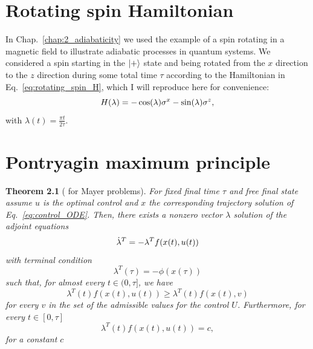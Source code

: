 \appendix

\chapter{Rotating spin Hamiltonian}\label{app:rotating_spin_hamiltonian}

In Chap.~\ref{chap:2_adiabaticity} we used the example of a spin rotating in a magnetic field to illustrate adiabatic processes in quantum systems. We considered a spin starting in the $\ket{+}$ state and being rotated from the $x$ direction to the $z$ direction during some total time $\tau$ according to the Hamiltonian in Eq.~\eqref{eq:rotating_spin_H}, which I will reproduce here for convenience:
\begin{equation}\label{eq:rotating_spin_H_lambda}
    H(\lambda) = -\cos(\lambda)\sigma^x - \sin(\lambda)\sigma^z,
\end{equation}
with $\lambda(t) = \frac{\pi t}{2 \tau}$.

\chapter{Pontryagin maximum principle}\label{app:PMP}

\newtheorem{theorem}{Theorem}

\begin{theorem}[ for Mayer problems]\label{thm:pmp}
    For fixed final time $\tau$ and free final state assume $u$ is the optimal control and $x$ the corresponding trajectory solution of Eq.~\eqref{eq:control_ODE}. Then, there exists a nonzero vector $\lambda$ solution of the adjoint equations
  \begin{equation}
      \dot{\lambda}^T = - \lambda^T f(x(t), u(t))
  \end{equation}
  with terminal condition
  \begin{equation}
      \lambda^T(\tau) = -\phi(x(\tau))
  \end{equation}
  such that, for almost every $t \in (0, \tau]$, we have
  \begin{equation}\label{eq:pmp_maximisation}
      \lambda^T(t) f(x(t), u(t)) \geq \lambda^T(t) f(x(t), v)
  \end{equation}
  for every $v$ in the set of the admissible values for the control $U$. Furthermore, for every $t \in [0, \tau]$
  \begin{equation}\label{eq:pmp_constant}
      \lambda^T(t) f(x(t), u(t)) = c,
  \end{equation}
  for a constant $c$
\end{theorem}

